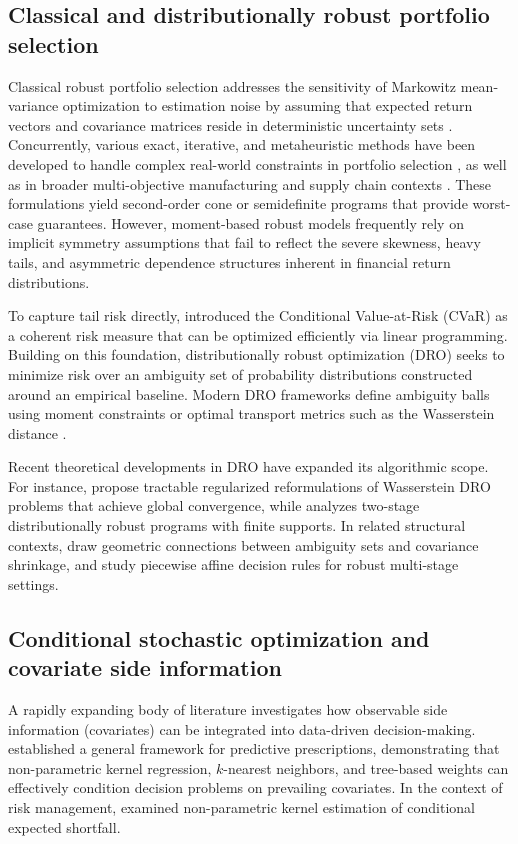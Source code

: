 \documentclass[smallextended]{svjour3}
\begin{document}
\subsection{Classical and distributionally robust portfolio selection}
Classical robust portfolio selection addresses the sensitivity of Markowitz mean-variance optimization to estimation noise by assuming that expected return vectors and covariance matrices reside in deterministic uncertainty sets \citep{goldfarb2003robust, fabozzi2007robust}. Concurrently, various exact, iterative, and metaheuristic methods have been developed to handle complex real-world constraints in portfolio selection \citep{bezoui2019iterative, regaigui2025memetic}, as well as in broader multi-objective manufacturing and supply chain contexts \citep{bezoui2024hybrid}. These formulations yield second-order cone or semidefinite programs that provide worst-case guarantees. However, moment-based robust models frequently rely on implicit symmetry assumptions that fail to reflect the severe skewness, heavy tails, and asymmetric dependence structures inherent in financial return distributions.

To capture tail risk directly, \citet{rockafellar2000optimization, rockafellar2002conditional} introduced the Conditional Value-at-Risk (CVaR) as a coherent risk measure that can be optimized efficiently via linear programming. Building on this foundation, distributionally robust optimization (DRO) seeks to minimize risk over an ambiguity set of probability distributions constructed around an empirical baseline. Modern DRO frameworks define ambiguity balls using moment constraints \citep{delage2010distributionally} or optimal transport metrics such as the Wasserstein distance \citep{esfahani2018data}.

Recent theoretical developments in DRO have expanded its algorithmic scope. For instance, \citet{chu2026wasserstein} propose tractable regularized reformulations of Wasserstein DRO problems that achieve global convergence, while \citet{agra2025two} analyzes two-stage distributionally robust programs with finite supports. In related structural contexts, \citet{yue2026geometric} draw geometric connections between ambiguity sets and covariance shrinkage, and \citet{thoma2026piecewise} study piecewise affine decision rules for robust multi-stage settings.

\subsection{Conditional stochastic optimization and covariate side information}
A rapidly expanding body of literature investigates how observable side information (covariates) can be integrated into data-driven decision-making. \citet{bertsimas2020predictive} established a general framework for predictive prescriptions, demonstrating that non-parametric kernel regression, $k$-nearest neighbors, and tree-based weights can effectively condition decision problems on prevailing covariates. In the context of risk management, \citet{scaillet2004nonparametric} examined non-parametric kernel estimation of conditional expected shortfall.
\end{document}
